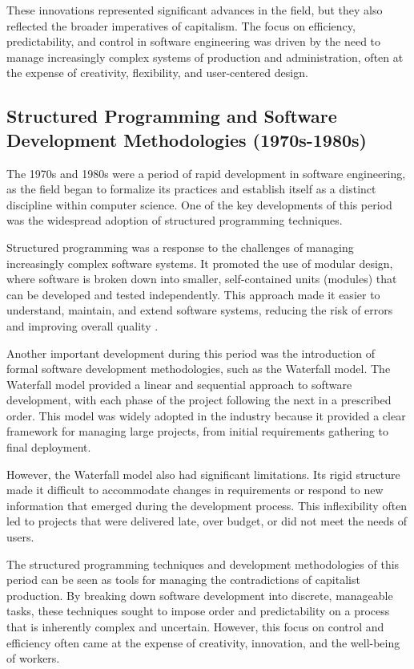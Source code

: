 \begin{refsection}
\begin{multicols}{2}
{These innovations represented significant advances in the field, but they also reflected the broader imperatives of capitalism. The focus on efficiency, predictability, and control in software engineering was driven by the need to manage increasingly complex systems of production and administration, often at the expense of creativity, flexibility, and user-centered design.

\subsection{Structured Programming and Software Development Methodologies (1970s-1980s)}

The 1970s and 1980s were a period of rapid development in software engineering, as the field began to formalize its practices and establish itself as a distinct discipline within computer science. One of the key developments of this period was the widespread adoption of structured programming techniques.

Structured programming was a response to the challenges of managing increasingly complex software systems. It promoted the use of modular design, where software is broken down into smaller, self-contained units (modules) that can be developed and tested independently. This approach made it easier to understand, maintain, and extend software systems, reducing the risk of errors and improving overall quality \cite[p. 121]{stroustrup1994}.

Another important development during this period was the introduction of formal software development methodologies, such as the Waterfall model. The Waterfall model provided a linear and sequential approach to software development, with each phase of the project following the next in a prescribed order. This model was widely adopted in the industry because it provided a clear framework for managing large projects, from initial requirements gathering to final deployment.

However, the Waterfall model also had significant limitations. Its rigid structure made it difficult to accommodate changes in requirements or respond to new information that emerged during the development process. This inflexibility often led to projects that were delivered late, over budget, or did not meet the needs of users.

The structured programming techniques and development methodologies of this period can be seen as tools for managing the contradictions of capitalist production. By breaking down software development into discrete, manageable tasks, these techniques sought to impose order and predictability on a process that is inherently complex and uncertain. However, this focus on control and efficiency often came at the expense of creativity, innovation, and the well-being of workers.

}
\end{multicols}
\end{refsection}
